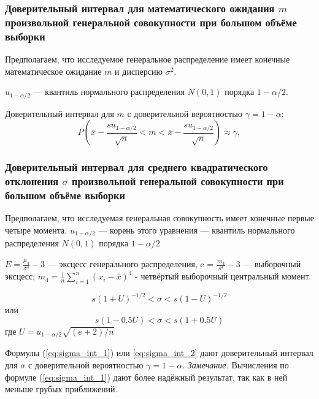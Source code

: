     \subsubsection{Доверительный интервал для математического ожидания $m$ произвольной генеральной совокупности при большом объёме выборки}
    Предполагаем, что исследуемое генеральное распределение имеет конечные математическое ожидание $m$ и дисперсию $\sigma^{2}$.

    $u_{1-\alpha/2}$ — квантиль нормального распределения $N(0,1)$ порядка $1-\alpha/2$.

    Доверительный интервал для $m$ с доверительной вероятностью $\gamma = 1-\alpha$:
    \begin{equation}
        P\left(\bar{x} - \frac{su_{1-\alpha/2}}{\sqrt{n}} < m < \bar{x} - \frac{su_{1-\alpha/2}}{\sqrt{n}} \right) \approx \gamma,
        \label{eq:p_fin_u}
    \end{equation}

    \subsubsection{Доверительный интервал для среднего квадратического отклонения $\sigma$ произвольной генеральной совокупности при большом объёме выборки}
    Предполагаем, что исследуемая генеральная совокупность имеет конечные первые четыре момента.
    \newline
    $u_{1-\alpha/2}$ — корень этого уравнения — квантиль нормального распределения $N(0,1)$ порядка $1-\alpha/2$

    $E = \frac{\mu_{4}}{\sigma^{4}} - 3$ — эксцесс генерального распределения, e = $\frac{m_{4}}{s^{4}} - 3$ — выборочный эксцесс; $m_{4} = \frac{1}{n}\sum_{i =1}^{n}{(x_{i} - \bar{x})^{4}}$  - четвёртый выборочный центральный момент.

    \begin{equation}
        s(1 + U)^{-1/2} < \sigma < s(1-U)^{-1/2}
        \label{eq:sigma_int_1}
    \end{equation}
     или
    \begin{equation}
        s(1-0.5U) < \sigma < s(1 + 0.5U)
        \label{eq:sigma_int_2}
    \end{equation}
    где $U = u_{1-\alpha/2} \sqrt{(e + 2)/n}$

    Формулы (\ref{eq:sigma_int_1}) или \ref{eq:sigma_int_2} дают доверительный интервал для $\sigma$ с доверительной вероятностью $\gamma = 1-\alpha$.
    \newline
    \textit{Замечание.} Вычисления по формуле (\ref{eq:sigma_int_1}) дают более надёжный результат, так как в ней меньше грубых приближений.